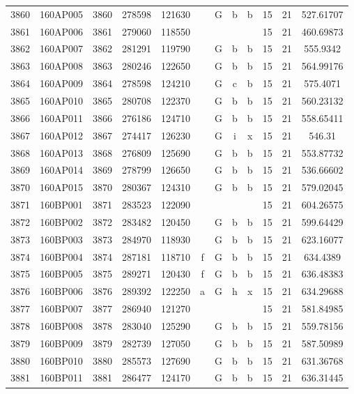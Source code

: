 \begin{tabular}{|*{12}{c|}}
3860 & 160AP005 & 3860 & 278598 & 121630 &  & G & b & b & 15 & 21 & 527.61707 \\ 
3861 & 160AP006 & 3861 & 279060 & 118550 &  &  &  &  & 15 & 21 & 460.69873 \\ 
3862 & 160AP007 & 3862 & 281291 & 119790 &  & G & b & b & 15 & 21 & 555.9342 \\ 
3863 & 160AP008 & 3863 & 280246 & 122650 &  & G & b & b & 15 & 21 & 564.99176 \\ 
3864 & 160AP009 & 3864 & 278598 & 124210 &  & G & c & b & 15 & 21 & 575.4071 \\ 
3865 & 160AP010 & 3865 & 280708 & 122370 &  & G & b & b & 15 & 21 & 560.23132 \\ 
3866 & 160AP011 & 3866 & 276186 & 124710 &  & G & b & b & 15 & 21 & 558.65411 \\ 
3867 & 160AP012 & 3867 & 274417 & 126230 &  & G & i & x & 15 & 21 & 546.31 \\ 
3868 & 160AP013 & 3868 & 276809 & 125690 &  & G & b & b & 15 & 21 & 553.87732 \\ 
3869 & 160AP014 & 3869 & 278799 & 126650 &  & G & b & b & 15 & 21 & 536.66602 \\ 
3870 & 160AP015 & 3870 & 280367 & 124310 &  & G & b & b & 15 & 21 & 579.02045 \\ 
3871 & 160BP001 & 3871 & 283523 & 122090 &  &  &  &  & 15 & 21 & 604.26575 \\ 
3872 & 160BP002 & 3872 & 283482 & 120450 &  & G & b & b & 15 & 21 & 599.64429 \\ 
3873 & 160BP003 & 3873 & 284970 & 118930 &  & G & b & b & 15 & 21 & 623.16077 \\ 
3874 & 160BP004 & 3874 & 287181 & 118710 & f & G & b & b & 15 & 21 & 634.4389 \\ 
3875 & 160BP005 & 3875 & 289271 & 120430 & f & G & b & b & 15 & 21 & 636.48383 \\ 
3876 & 160BP006 & 3876 & 289392 & 122250 & a & G & h & x & 15 & 21 & 634.29688 \\ 
3877 & 160BP007 & 3877 & 286940 & 121270 &  &  &  &  & 15 & 21 & 581.84985 \\ 
3878 & 160BP008 & 3878 & 283040 & 125290 &  & G & b & b & 15 & 21 & 559.78156 \\ 
3879 & 160BP009 & 3879 & 282739 & 127050 &  & G & b & b & 15 & 21 & 587.50989 \\ 
3880 & 160BP010 & 3880 & 285573 & 127690 &  & G & b & b & 15 & 21 & 631.36768 \\ 
3881 & 160BP011 & 3881 & 286477 & 124170 &  & G & b & b & 15 & 21 & 636.31445 \\ 

\end{tabular}
